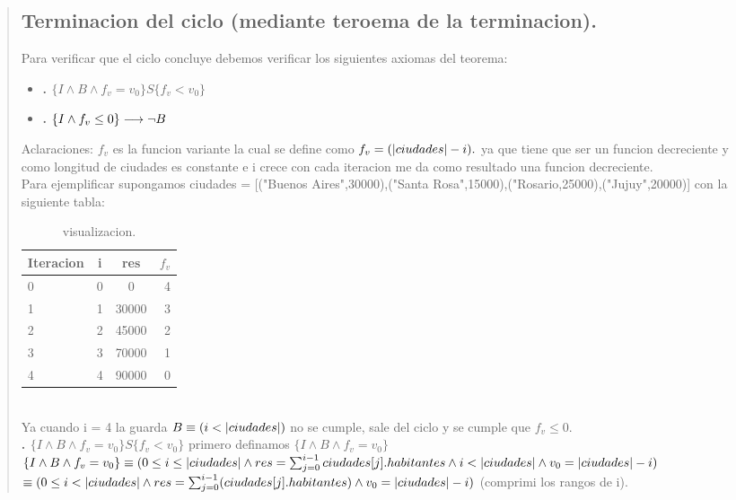 \documentclass[10pt,a4paper]{article}
\begin{document}
\begin{quote}
\subsection{Terminacion del ciclo (mediante teroema de la terminacion).}
 Para verificar que el ciclo concluye debemos verificar los siguientes axiomas del teorema: 
 \begin{itemize}
 	\item \textbf{. $\{I \land B \land f_v = v_0\} S \{f_v < v_0\}$}
 	\item \textbf{. $\{I \land f_v \leq 0\} \longrightarrow \neg B$} 
 \end{itemize}
 Aclaraciones: $f_v$ es la funcion variante la cual se define como $f_v = (|ciudades| - i).$ ya que tiene que ser un funcion decreciente y como longitud de ciudades es constante e i crece con cada iteracion me da como resultado una funcion decreciente. \\ [0.2cm] 
 Para ejemplificar supongamos ciudades = [("Buenos Aires",30000),("Santa Rosa",15000),("Rosario,25000),("Jujuy",20000)] con la siguiente tabla: \\ [0.2cm]
 \begin{table}[h!]
 	\centering
 	\begin{tabular}{||l c c r||} 
 		\hline
 		Iteracion & i & res & $f_v$ \\ [0.5ex] 
 		\hline\hline
 		0 & 0 & 0 & 4 \\ 
 		1 & 1 & 30000 & 3 \\
 		2 & 2 & 45000 & 2 \\
 		3 & 3 & 70000 & 1 \\
 		4 & 4 & 90000 & 0 \\
 		\hline
 	\end{tabular}
 	\caption{visualizacion.}
 	\label{tab:ejemplo}
 \end{table} \\ 
 Ya cuando i = 4 la guarda $B \equiv (i < |ciudades|)$ no se cumple, sale del ciclo y se cumple que $f_v \leq 0$. \\ [0.2cm]
 \textbf{. $\{I \land B \land f_v = v_0\} S \{f_v < v_0\}$} 
 primero definamos $\{I \land B \land f_v = v_0\}$ \\ [0.1cm]
 $\{I \land B \land f_v = v_0\} \equiv (0 \leq i \leq |ciudades| \land res = \sum_{j=0}^{i-1}ciudades[j].habitantes \land i < |ciudades| \land v_0 = |ciudades|-i)$  \\ 
 $\equiv(0 \leq i < |ciudades| \land res = \sum_{j=0}^{i-1}(ciudades[j].habitantes) \land v_0 = |ciudades|-i)$ {(comprimi los rangos de i).} \\ [0.1cm]

\end{quote}
\end{document}
